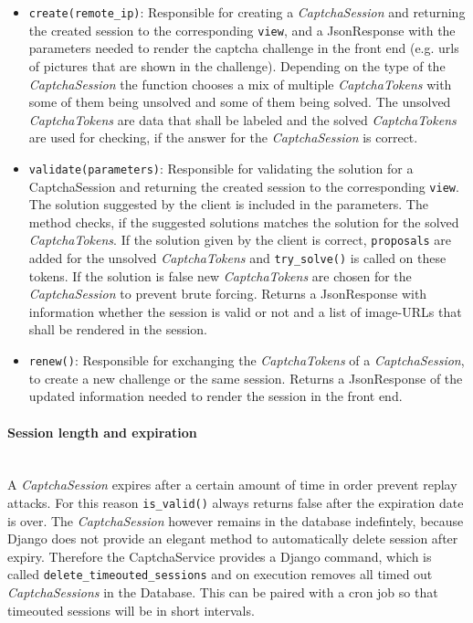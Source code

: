 \begin{itemize}
\item \verb|create(remote_ip)|: Responsible for creating a \emph{CaptchaSession} and returning the created session to the corresponding \verb|view|, and a JsonResponse with the parameters needed to render the captcha challenge in the front end (e.g. urls of pictures that are shown in the challenge). Depending on the type of the \emph{CaptchaSession} the function chooses a mix of multiple \emph{CaptchaTokens} with some of them being unsolved and some of them being solved. The unsolved \emph{CaptchaTokens} are data that shall be labeled and the solved \emph{CaptchaTokens} are used for checking, if the answer for the \emph{CaptchaSession} is correct. 
\item \verb|validate(parameters)|: Responsible for validating the solution for a CaptchaSession and returning the created session to the corresponding \verb|view|. The solution suggested by the client is included in the parameters. The method checks, if the suggested solutions matches the solution for the solved \emph{CaptchaTokens}. If the solution given by the client is correct, \verb|proposals| are added for the unsolved \emph{CaptchaTokens} and \verb|try_solve()| is called on these tokens. If the solution is false new \emph{CaptchaTokens} are chosen for the \emph{CaptchaSession} to prevent brute forcing. Returns a JsonResponse with information whether the session is valid or not and a list of image-URLs that shall be rendered in the session.
\item \verb|renew()|: Responsible for exchanging the \emph{CaptchaTokens} of a \emph{CaptchaSession}, to create a new challenge or the same session. Returns a JsonResponse of the updated information needed to render the session in the front end.
\end{itemize}

\paragraph{Session length and expiration} \mbox{} \\

A \emph{CaptchaSession} expires after a certain amount of time in order prevent replay attacks. For this reason \verb|is_valid()| always returns false after the expiration date is over. The \emph{CaptchaSession} however remains in the database indefintely, because Django does not provide an elegant method to automatically delete session after expiry. Therefore the CaptchaService provides a Django command, which is called \verb|delete_timeouted_sessions| and on execution removes all timed out \emph{CaptchaSessions} in the Database. This can be paired with a cron job so that timeouted sessions will be in short intervals. 


